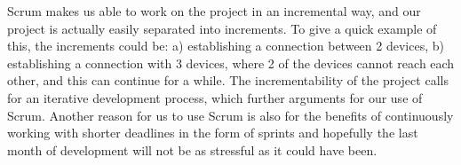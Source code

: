 Scrum makes us able to work on the project in an incremental way, and our project is actually easily separated into increments.
To give a quick example of this, the increments could be: a) establishing a connection between 2 devices, b) establishing a connection with 3 devices, where 2 of the devices cannot reach each other, and this can continue for a while.
The incrementability of the project calls for an iterative development process, which further arguments for our use of Scrum.
Another reason for us to use Scrum is also for the benefits of continuously working with shorter deadlines in the form of sprints and hopefully the last month of development will not be as stressful as it could have been.
